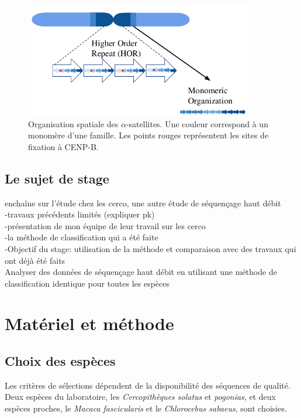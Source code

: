\documentclass[12pt,a4paper]{article}
\begin{document}
\begin{figure}
\center
\includegraphics[height=5cm, width=10cm]{img/organization.png}
\caption{Organisation spatiale des $\alpha$-satellites. Une couleur correspond à un monomère d'une famille. Les points rouges représentent les sites de fixation à CENP-B.}
\end{figure}


\subsection{Le sujet de stage}
enchaîne sur l'étude chez les cerco, une autre étude de séquençage haut débit\\

-travaux précédents limités (expliquer pk)\\
-présentation de mon équipe de leur travail sur les cerco\\
-la méthode de classification qui a été faite\\
-Objectif du stage: utilisation de la méthode et comparaison avec des travaux qui ont déjà été faits\\

Analyser des données de séquençage haut débit en utilisant une méthode de classification identique pour toutes les espèces\\

\section{Matériel et méthode}
\subsection{Choix des espèces}
Les critères de sélections dépendent de la disponibilité des séquences de qualité. Deux espèces du laboratoire, les \textit{Cercopithèques solatus} et \textit{pogonias}, et deux espèces proches, le \textit{Macaca fascicularis} et le \textit{Chlorocebus sabaeus}, sont choisies.  
\end{document}
